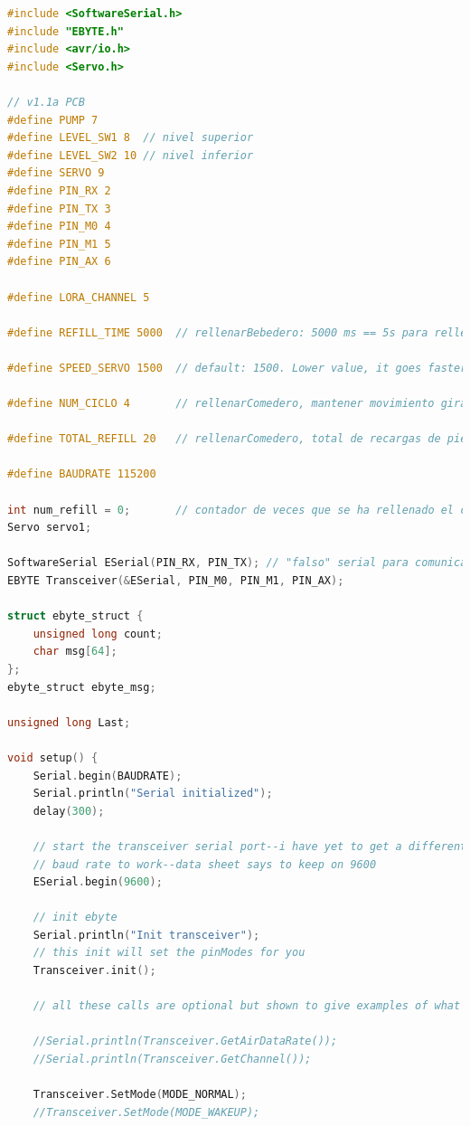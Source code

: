 \documentclass[12pt]{article}
\begin{document}
	\begin{lstlisting}[language=C]
#include <SoftwareSerial.h>
#include "EBYTE.h"
#include <avr/io.h>
#include <Servo.h>

// v1.1a PCB
#define PUMP 7
#define LEVEL_SW1 8  // nivel superior
#define LEVEL_SW2 10 // nivel inferior
#define SERVO 9
#define PIN_RX 2
#define PIN_TX 3
#define PIN_M0 4
#define PIN_M1 5
#define PIN_AX 6

#define LORA_CHANNEL 5

#define REFILL_TIME 5000  // rellenarBebedero: 5000 ms == 5s para rellenar bebedero (default)

#define SPEED_SERVO 1500  // default: 1500. Lower value, it goes faster

#define NUM_CICLO 4       // rellenarComedero, mantener movimiento giratorio en un ciclo de rellenado

#define TOTAL_REFILL 20   // rellenarComedero, total de recargas de pienso desde reserva hasta llegar al 80% de vaciado (20% no lo contamos por seguridad)

#define BAUDRATE 115200

int num_refill = 0;       // contador de veces que se ha rellenado el comedero desde la reserva, si es igual a TOTAL_REFILL entonces dejamos de rellenar
Servo servo1;

SoftwareSerial ESerial(PIN_RX, PIN_TX); // "falso" serial para comunicarnos con el E32 (creado en SW)
EBYTE Transceiver(&ESerial, PIN_M0, PIN_M1, PIN_AX);

struct ebyte_struct {
	unsigned long count;
	char msg[64];
};
ebyte_struct ebyte_msg;

unsigned long Last;

void setup() {
	Serial.begin(BAUDRATE);
	Serial.println("Serial initialized");
	delay(300);
	
	// start the transceiver serial port--i have yet to get a different
	// baud rate to work--data sheet says to keep on 9600
	ESerial.begin(9600);
	
	// init ebyte
	Serial.println("Init transceiver");
	// this init will set the pinModes for you
	Transceiver.init();
	
	// all these calls are optional but shown to give examples of what you can do
	
	//Serial.println(Transceiver.GetAirDataRate());
	//Serial.println(Transceiver.GetChannel());
	
	Transceiver.SetMode(MODE_NORMAL);
	//Transceiver.SetMode(MODE_WAKEUP);
	

\end{lstlisting}
\end{document}
